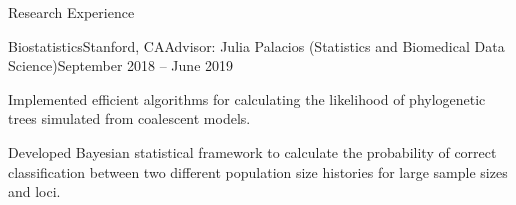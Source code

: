 \begin{rSection}{Research Experience}
\begin{rSubsection}{Biostatistics}{Stanford, CA}{Advisor: Julia Palacios (Statistics and Biomedical Data Science)}{September 2018 -- June 2019}
\item Implemented efficient algorithms for calculating the likelihood of phylogenetic trees simulated from coalescent models.

\item Developed Bayesian statistical framework to calculate the probability of correct classification between two different population size histories for large sample sizes and loci. 


\end{rSubsection}


\end{rSection}
